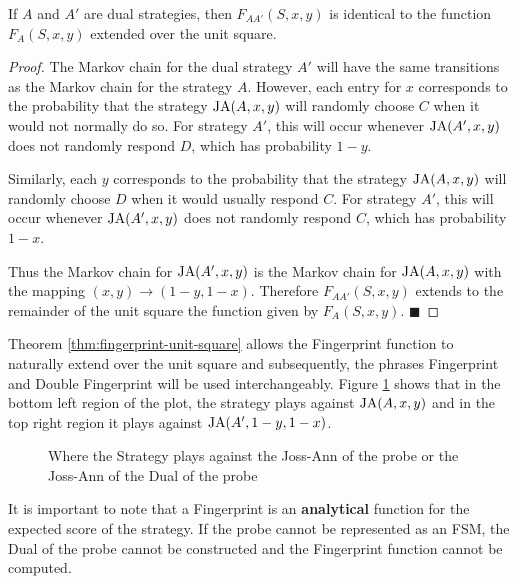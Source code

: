 \begin{theorem}\label{thm:fingerprint-unit-square}
If $A$ and $A'$ are dual strategies, then $F_{AA'}(S, x, y)$ is identical to the function $F_A(S, x, y)$ extended over the unit square.
\end{theorem}


\begin{proof}\label{prf:fingerprint-unit-square}
The Markov chain for the dual strategy $A'$ will have the same transitions as the Markov chain for the strategy $A$.
However, each entry for $x$ corresponds to the probability that the strategy $\text{JA}(A, x, y)$ will randomly choose $C$ when it would not normally do so.
For strategy $A'$, this will occur whenever $\text{JA}(A', x, y)$ does not randomly respond $D$, which has probability $1 - y$.

Similarly, each $y$ corresponds to the probability that the strategy $\text{JA}(A, x, y)$ will randomly choose $D$ when it would usually respond $C$.
For strategy $A'$, this will occur whenever $\text{JA}(A', x, y)$ does not randomly respond $C$, which has probability $1 - x$.

Thus the Markov chain for $\text{JA}(A', x, y)$ is the Markov chain for $\text{JA}(A, x, y)$ with the mapping $(x, y) \rightarrow (1-y, 1-x)$.
Therefore $F_{AA'}(S, x, y)$ extends to the remainder of the unit square the function given by $F_A(S, x, y)$. $\blacksquare$
\end{proof}

Theorem \ref{thm:fingerprint-unit-square} allows the Fingerprint function to naturally extend over the unit square and subsequently, the phrases Fingerprint and Double Fingerprint will be used interchangeably.
Figure \ref{fig:DualProbe} shows that in the \textcolor{sol-violet}{bottom left} region of the plot, the strategy plays against $\text{JA}(A, x, y)$ and in the \textcolor{sol-cyan}{top right} region it plays against $\text{JA}(A', 1-y, 1-x)$.

\begin{figure}[!hbtp]
    \begin{center}
        
        \caption{Where the Strategy plays against the Joss-Ann of the probe or the Joss-Ann of the Dual of the probe}\label{fig:DualProbe}
    \end{center}
\end{figure}

It is important to note that a Fingerprint is an \textbf{analytical} function for the expected score of the strategy.
If the probe cannot be represented as an FSM, the Dual of the probe cannot be constructed and the Fingerprint function cannot be computed.



